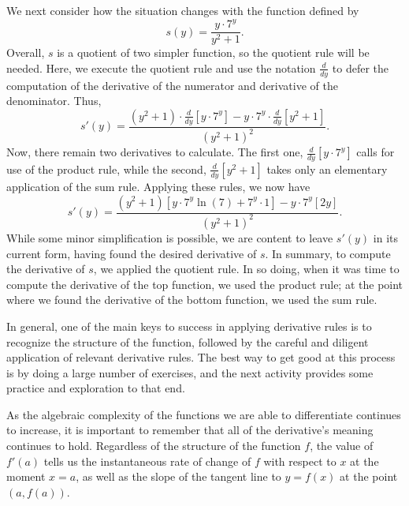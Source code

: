 We next consider how the situation changes with the function defined by
$$s(y) = \frac{y \cdot 7^y}{y^2 + 1}.$$ 
Overall, $s$ is a quotient of two simpler function, so the quotient rule will be needed.  Here, we execute the quotient rule and use the notation $\frac{d}{dy}$ to defer the computation of the derivative of the numerator and derivative of the denominator.  Thus,
$$s'(y) = \frac{(y^2 + 1) \cdot \frac{d}{dy}\left[ y \cdot 7^y \right] - y \cdot 7^y \cdot \frac{d}{dy}\left[y^2 + 1 \right]}{(y^2 + 1)^2}.$$
Now, there remain two derivatives to calculate.  The first one, $\frac{d}{dy}\left[ y \cdot 7^y \right]$ calls for use of the product rule, while the second, $\frac{d}{dy}\left[y^2 + 1 \right]$ takes only an elementary application of the sum rule.  Applying these rules, we now have
$$s'(y) = \frac{(y^2 + 1) [y \cdot 7^y \ln(7) + 7^y \cdot 1] - y \cdot 7^y [2y]}{(y^2 + 1)^2}.$$
While some minor simplification is possible, we are content to leave $s'(y)$ in its current form, having found the desired derivative of $s$.  In summary, to compute the derivative of $s$, we applied the quotient rule.  In so doing, when it was time to compute the derivative of the top function, we used the product rule; at the point where we found the derivative of the bottom function, we used the sum rule.

In general, one of the main keys to success in applying derivative rules is to recognize the structure of the function, followed by the careful and diligent application of relevant derivative rules.  The best way to get good at this process is by doing a large number of exercises, and the next activity provides some practice and exploration to that end.



As the algebraic complexity of the functions we are able to differentiate continues to increase, it is important to remember that all of the derivative's meaning continues to hold.  Regardless of the structure of the function $f$, the value of $f'(a)$ tells us the instantaneous rate of change of $f$ with respect to $x$ at the moment $x = a$, as well as the slope of the tangent line to $y = f(x)$ at the point $(a,f(a))$.

\newpage


